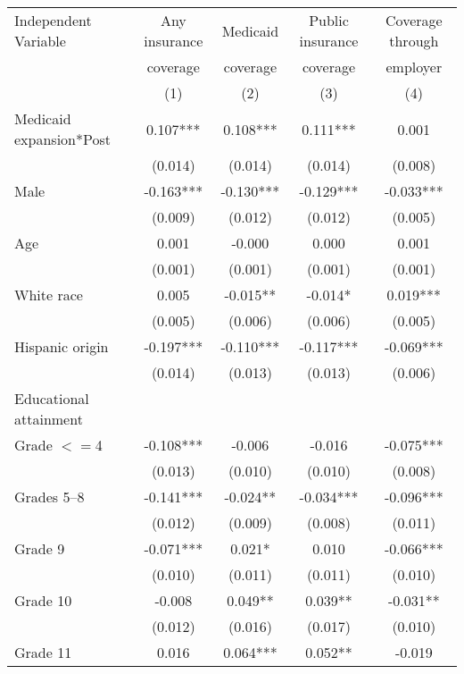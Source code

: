 \begin{tabular}{lcccc}
\toprule
\toprule
 Independent Variable & Any insurance & Medicaid & Public insurance & Coverage through \\
  & coverage & coverage & coverage &  employer \\
  & (1) & (2) & (3) &  (4) \\
\midrule 
 Medicaid expansion*Post   & 0.107***   & 0.108***   & 0.111***   & 0.001  \\
 & (0.014)   & (0.014)   & (0.014)   & (0.008)  \\
 Male   & -0.163***   & -0.130***   & -0.129***   & -0.033***  \\
 & (0.009)   & (0.012)   & (0.012)   & (0.005)  \\
 Age   & 0.001   & -0.000   & 0.000   & 0.001  \\
 & (0.001)   & (0.001)   & (0.001)   & (0.001)  \\
 White race   & 0.005   & -0.015**   & -0.014*   & 0.019***  \\
 & (0.005)   & (0.006)   & (0.006)   & (0.005)  \\
 Hispanic origin   & -0.197***   & -0.110***   & -0.117***   & -0.069***  \\
 & (0.014)   & (0.013)   & (0.013)   & (0.006)  \\
 Educational attainment  \\
 \hspace{0.3cm} Grade $<=$4   & -0.108***   & -0.006   & -0.016   & -0.075***  \\
 & (0.013)   & (0.010)   & (0.010)   & (0.008)  \\
 \hspace{0.3cm}  Grades 5--8   & -0.141***   & -0.024**   & -0.034***   & -0.096***  \\
 & (0.012)   & (0.009)   & (0.008)   & (0.011)  \\
 \hspace{0.3cm} Grade 9   & -0.071***   & 0.021*   & 0.010   & -0.066***  \\
 & (0.010)   & (0.011)   & (0.011)   & (0.010)  \\
 \hspace{0.3cm} Grade 10   & -0.008   & 0.049**   & 0.039**   & -0.031**  \\
 & (0.012)   & (0.016)   & (0.017)   & (0.010)  \\
 \hspace{0.3cm} Grade 11   & 0.016   & 0.064***   & 0.052**   & -0.019  \\

\end{tabular}
